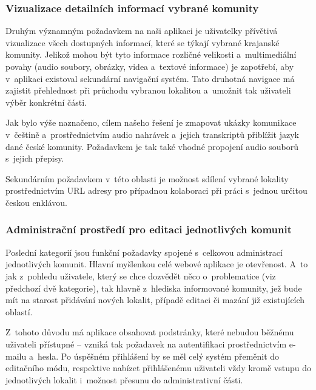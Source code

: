 \hypertarget{vizualizace-detailnuxedch-informacuxed-vybranuxe9-komunity}{%
\subsubsection{Vizualizace detailních informací vybrané komunity}\label{vizualizace-detailnuxedch-informacuxed-vybranuxe9-komunity}}

Druhým významným požadavkem na naši aplikaci je uživatelky přívětivá vizualizace všech dostupných informací, které se týkají vybrané krajanské komunity. Jelikož mohou být tyto informace rozličné velikosti a~multimediální povahy (audio soubory, obrázky, videa a~textové informace) je zapotřebí, aby v~aplikaci existoval sekundární navigační systém. Tato druhotná navigace má zajistit přehlednost při průchodu vybranou lokalitou a~umožnit tak uživateli výběr konkrétní části.

Jak bylo výše naznačeno, cílem našeho řešení je zmapovat ukázky komunikace v~češtině a~prostřednictvím audio nahrávek a~jejich transkriptů přiblížit jazyk dané české komunity. Požadavkem je tak také vhodné propojení audio souborů s~jejich přepisy.

Sekundárním požadavkem v~této oblasti je možnost sdílení vybrané lokality prostřednictvím URL adresy pro případnou kolaboraci při práci s~jednou určitou českou enklávou.

\hypertarget{administraux10dnuxed-prostux159eduxed-pro-editaci-jednotlivuxfdch-komunit}{%
\subsubsection{Administrační prostředí pro editaci jednotlivých komunit}\label{administraux10dnuxed-prostux159eduxed-pro-editaci-jednotlivuxfdch-komunit}}

Poslední kategorií jsou funkční požadavky spojené s~celkovou administrací jednotlivých komunit. Hlavní myšlenkou celé webové aplikace je otevřenost. A~to jak z~pohledu uživatele, který se chce dozvědět něco o~problematice (viz předchozí dvě kategorie), tak hlavně z~hlediska informované komunity, jež bude mít na starost přidávání nových lokalit, případě editaci či mazání již existujících oblastí.

Z~tohoto důvodu má aplikace obsahovat podstránky, které nebudou běžnému uživateli přístupné -- vzniká tak požadavek na autentifikaci prostřednictvím e-mailu a~hesla. Po úspěšném přihlášení by se měl celý systém přeměnit do editačního módu, respektive nabízet přihlášenému uživateli vždy kromě vstupu do jednotlivých lokalit i~možnost přesunu do administrativní části.


